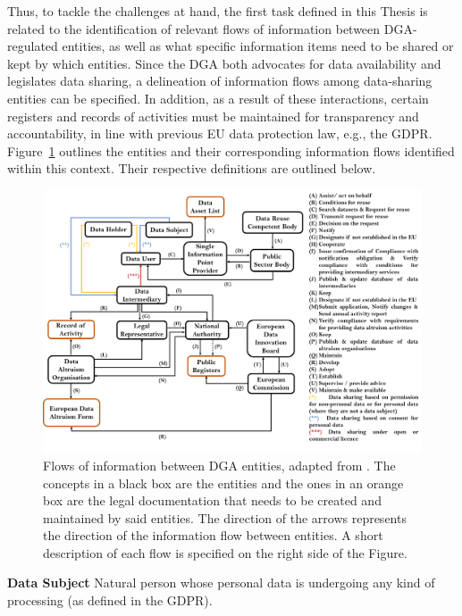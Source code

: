 Thus, to tackle the challenges at hand, the first task defined in this Thesis is related to the identification of relevant flows of information between DGA-regulated entities, as well as what specific information items need to be shared or kept by which entities.
Since the DGA both advocates for data availability and legislates data sharing, a delineation of information flows among data-sharing entities can be specified.
In addition, as a result of these interactions, certain registers and records of activities must be maintained for transparency and accountability, in line with previous EU data protection law, e.g., the GDPR.
Figure~\ref{fig:dga_flow} outlines the entities and their corresponding information flows identified within this context.
Their respective definitions are outlined below.

\begin{figure}[ht]
\centering
\includegraphics[width=\textwidth]{figures/chapter-7/information-flows.png}
\caption[Flows of information between DGA entities.]{Flows of information between DGA entities, adapted from \cite{esteves_semantics_2023}. The concepts in a black box are the entities and the ones in an orange box are the legal documentation that needs to be created and maintained by said entities. The direction of the arrows represents the direction of the information flow between entities. A short description of each flow is specified on the right side of the Figure.}
\label{fig:dga_flow}
\end{figure}

\textbf{Data Subject} Natural person whose personal data is undergoing any kind of processing (as defined in the GDPR).

